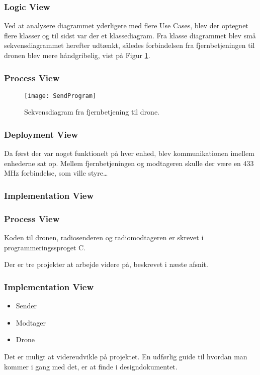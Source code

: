 \documentclass[Main]{subfiles}
\begin{document}


\subsubsection*{Logic View}
Ved at analysere diagrammet yderligere med flere Use Cases, blev der optegnet flere klasser og til sidst var der et klassediagram. 
Fra klasse diagrammet blev små sekvensdiagrammet herefter udtænkt, således forbindelsen fra fjernbetjeningen til dronen blev mere håndgribelig, vist på Figur \ref{Fig:sendProgram}.
\subsubsection*{Process View}

\begin{figure}[H]
\centering
\texttt{[image: SendProgram]}
\caption{Sekvensdiagram fra fjernbetjening til drone.}
\label{Fig:sendProgram}
\end{figure}

\subsubsection*{Deployment View}
Da først der var noget funktionelt på hver enhed, blev kommunikationen imellem enhederne sat op.
Mellem fjernbetjeningen og modtageren skulle der være en 433 MHz forbindelse, som ville styre\dots{}
\subsubsection*{Implementation View}

\subsubsection*{Process View}
Koden til dronen, radiosenderen og radiomodtageren er skrevet i programmeringssproget C.

Der er tre projekter at arbejde videre på, beskrevet i næste afsnit.

\subsubsection*{Implementation View}
\begin{itemize}
\item Sender
\item Modtager
\item Drone
\end{itemize}

Det er muligt at videreudvikle på projektet.
En udførlig guide til hvordan man kommer i gang med det, er at finde i  designdokumentet\cite[afs. 2.4]{Design}.
\end{document}

